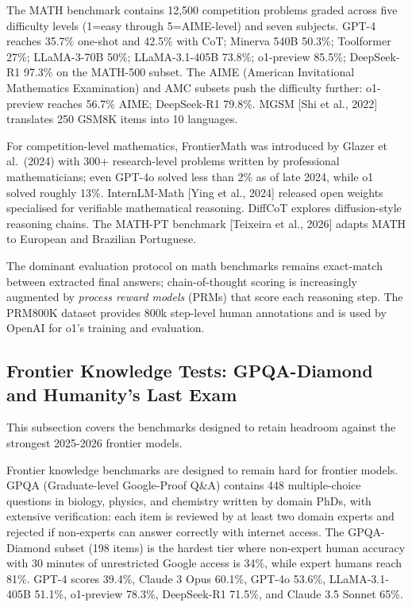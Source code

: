 \documentclass{article}
\begin{document}
The MATH benchmark \cite{hendrycks2021measuringmassivemu} contains 12,500 competition problems graded across five difficulty levels (1=easy through 5=AIME-level) and seven subjects. GPT-4 reaches 35.7\% one-shot and 42.5\% with CoT; Minerva 540B 50.3\%; Toolformer 27\%; LLaMA-3-70B 50\%; LLaMA-3.1-405B 73.8\%; o1-preview 85.5\%; DeepSeek-R1 97.3\% on the MATH-500 subset. The AIME (American Invitational Mathematics Examination) and AMC subsets push the difficulty further: o1-preview reaches 56.7\% AIME; DeepSeek-R1 79.8\%. MGSM {[}Shi et al., 2022{]} translates 250 GSM8K items into 10 languages.

For competition-level mathematics, FrontierMath was introduced by Glazer et al.~(2024) with 300+ research-level problems written by professional mathematicians; even GPT-4o solved less than 2\% as of late 2024, while o1 solved roughly 13\%. InternLM-Math {[}Ying et al., 2024{]} released open weights specialised for verifiable mathematical reasoning. DiffCoT \cite{cao20262026} explores diffusion-style reasoning chains. The MATH-PT benchmark {[}Teixeira et al., 2026{]} adapts MATH to European and Brazilian Portuguese.

The dominant evaluation protocol on math benchmarks remains exact-match between extracted final answers; chain-of-thought scoring is increasingly augmented by \emph{process reward models} (PRMs) that score each reasoning step. The PRM800K dataset \citep{lightman20242024} provides 800k step-level human annotations and is used by OpenAI for o1's training and evaluation.

\subsection{Frontier Knowledge Tests: GPQA-Diamond and Humanity's Last Exam}\label{frontier-knowledge-tests-gpqa-diamond-and-humanitys-last-exam}

This subsection covers the benchmarks designed to retain headroom against the strongest 2025-2026 frontier models.

Frontier knowledge benchmarks are designed to remain hard for frontier models. GPQA (Graduate-level Google-Proof Q\&A) \cite{rein2024gpqaagraduatelevel} contains 448 multiple-choice questions in biology, physics, and chemistry written by domain PhDs, with extensive verification: each item is reviewed by at least two domain experts and rejected if non-experts can answer correctly with internet access. The GPQA-Diamond subset (198 items) is the hardest tier where non-expert human accuracy with 30 minutes of unrestricted Google access is 34\%, while expert humans reach 81\%. GPT-4 scores 39.4\%, Claude 3 Opus 60.1\%, GPT-4o 53.6\%, LLaMA-3.1-405B 51.1\%, o1-preview 78.3\%, DeepSeek-R1 71.5\%, and Claude 3.5 Sonnet 65\%.
\end{document}
